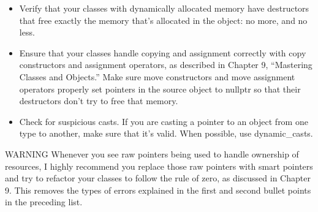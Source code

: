 
\begin{itemize}
\item
Verify that your classes with dynamically allocated memory have destructors that free exactly the memory that’s allocated in the object: no more, and no less.

\item
Ensure that your classes handle copying and assignment correctly with copy constructors and assignment operators, as described in Chapter 9, “Mastering Classes and Objects.” Make sure move constructors and move assignment operators properly set pointers in the source object to nullptr so that their destructors don’t try to free that memory.

\item
Check for suspicious casts. If you are casting a pointer to an object from one type to another, make sure that it’s valid. When possible, use dynamic\_casts.
\end{itemize}

\begin{myWarning}{WARNING}
Whenever you see raw pointers being used to handle ownership of resources, I highly recommend you replace those raw pointers with smart pointers and try to refactor your classes to follow the rule of zero, as discussed in Chapter 9. This removes the types of errors explained in the first and second bullet points in the preceding list.
\end{myWarning}


